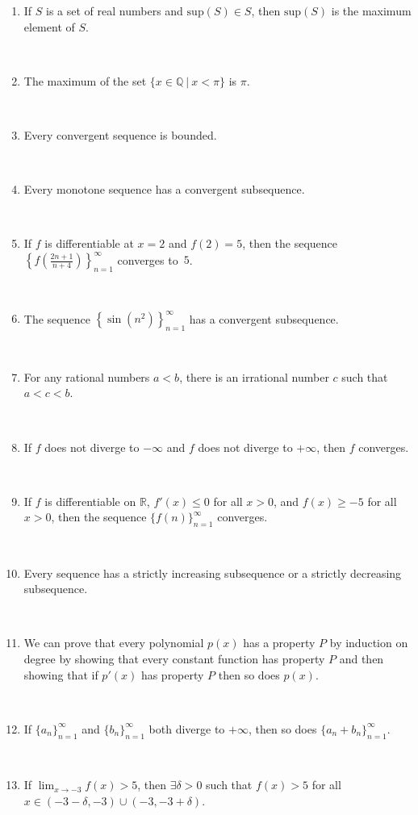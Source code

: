 \documentclass[12pt]{amsart}
\newcommand{\Q}{\mathbb{Q}}
\newcommand{\R}{{\mathbb{R}}}
\numberwithin{equation}{section}
\theoremstyle{plain} %
\theoremstyle{definition}
\theoremstyle{remark}
\begin{document}
\begin{enumerate}
\item If $S$ is a set of real numbers and $\mathrm{sup}(S) \in S$, then $\mathrm{sup}(S)$ is the maximum element of $S$.

\

\item The maximum of the set $\{ x\in \Q \ | \ x< \pi\}$ is $\pi$.

\


\item Every  convergent sequence is bounded.

\

\item Every monotone sequence has a convergent subsequence.

\

\item If $f$ is differentiable at $x=2$ and $f(2) = 5$, then the sequence $\displaystyle\left\{ f\left(\frac{2n + 1}{n+4}\right) \right\}_{n=1}^\infty$ converges to~$5$.


\



\item The sequence $\displaystyle \left\{ {\sin(n^2)} \right\}_{n=1}^\infty$ has a convergent subsequence.

\


\item For any rational numbers $a <b$, there is an irrational number $c$ such that $a<c<b$.

\

\item If $f$ does not diverge to $-\infty$ and $f$ does not diverge to $+\infty$, then $f$ converges.

\

\item If $f$ is differentiable on $\R$, $f'(x) \leq 0$ for all $x>0$, and $f(x) \geq -5$ for all $x>0$, then the sequence $\{f(n)\}_{n=1}^\infty$ converges.

\

\item Every sequence has a strictly increasing subsequence or a strictly decreasing subsequence.

\

\item We can prove that every polynomial $p(x)$ has a property $P$ by induction on degree by showing that every constant function has property $P$ and then showing that if $p'(x)$ has property $P$ then so does $p(x)$.


\

\item If $\{a_n\}_{n=1}^\infty$ and $\{b_n\}_{n=1}^\infty$ both diverge to $+\infty$, then so does $\{a_n+b_n\}_{n=1}^\infty$.

\


\item If $\displaystyle \lim_{x\to -3} f(x) > 5$, then $\exists \delta>0$ such that $f(x) > 5$ for all $x\in (-3- \delta,-3) \cup (-3,-3+\delta)$.
		
\end{enumerate}
\end{document}

